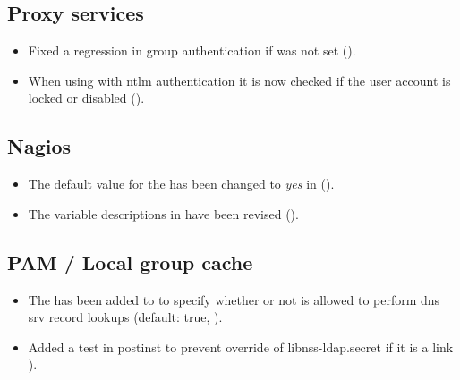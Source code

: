 \subsection{Proxy services}
\begin{itemize}
\item Fixed a regression in  group authentication if 
was not set ().
\item When using  with ntlm authentication it is now checked if the user account
is locked or disabled ().
\end{itemize}


\subsection{Nagios}
\begin{itemize}

\item The default value for the  has been
changed to \emph{yes} in  ().

\item The \ucsUCR{} variable descriptions in
   have been revised ().

\end{itemize}



\subsection{PAM / Local group cache}
\begin{itemize}
\item The  has been added to
 to specify whether or not 
is allowed to perform dns srv record lookups (default: true,
).
\item Added a test in  postinst to prevent override
of libnss-ldap.secret if it is a link ).
\end{itemize}

